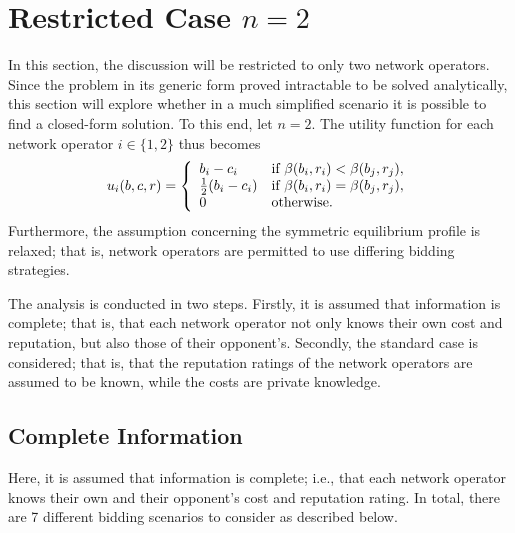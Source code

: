 \section{Restricted Case $n=2$} %
\label{sec:direct_restricted_case_n_2_direct}
In this section, the discussion will be restricted to only two network operators. Since the problem in its generic form proved intractable to be solved analytically, this section will explore whether in a much simplified scenario it is possible to find a closed-form solution. To this end, let $n=2$. The utility function for each network operator $i\in \{1, 2\}$ thus becomes
\begin{equation}
	\label{eq:utility_n_2_direct}
	u_i(b,c,r) = \left\{
	\begin{array}{l l}
		b_i - c_i &\text{if } \beta(b_i,r_i) < \beta(b_j,r_j),\\
		\frac{1}{2}(b_i - c_i) &\text{if } \beta(b_i,r_i) = \beta(b_j,r_j),\\
		0 &\text{otherwise}.
	\end{array}\right.
\end{equation}
Furthermore, the assumption concerning the symmetric equilibrium profile is relaxed; that is, network operators are permitted to use differing bidding strategies.

The analysis is conducted in two steps. Firstly, it is assumed that information is complete; that is, that each network operator not only knows their own cost and reputation, but also those of their opponent's. Secondly, the standard case is considered; that is, that the reputation ratings of the network operators are assumed to be known, while the costs are private knowledge.

\subsection{Complete Information} %
\label{sub:complete_information_n_2_direct}
Here, it is assumed that information is complete; i.e., that each network operator knows their own and their opponent's cost and reputation rating. In total, there are 7 different bidding scenarios to consider as described below.

